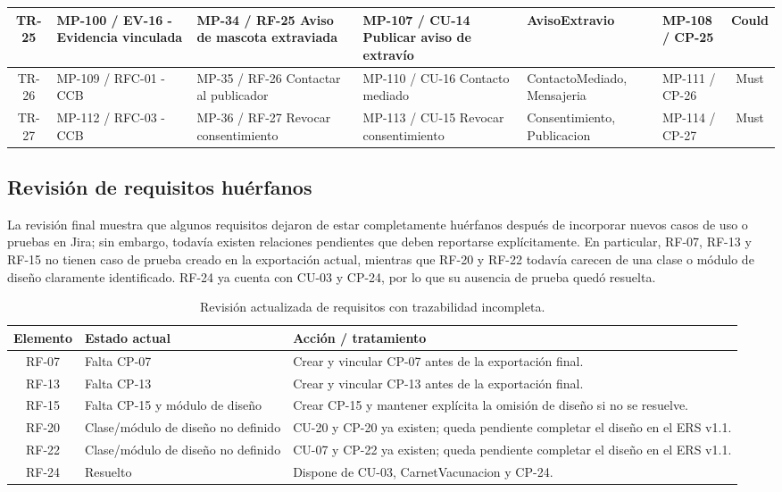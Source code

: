 \documentclass[journal,onecolumn]{IEEEtran}
\begin{document}
\begin{longtable}{|c|p{2.6cm}|p{2.9cm}|p{2.9cm}|p{2.6cm}|p{1.8cm}|c|}
		\hline
		TR-25 & MP-100 / EV-16 - Evidencia vinculada & MP-34 / RF-25 Aviso de mascota extraviada & MP-107 / CU-14 Publicar aviso de extravío & AvisoExtravio & MP-108 / CP-25 & Could \\
		\hline
		TR-26 & MP-109 / RFC-01 - CCB & MP-35 / RF-26 Contactar al publicador & MP-110 / CU-16 Contacto mediado & ContactoMediado, Mensajeria & MP-111 / CP-26 & Must \\
		\hline
		TR-27 & MP-112 / RFC-03 - CCB & MP-36 / RF-27 Revocar consentimiento & MP-113 / CU-15 Revocar consentimiento & Consentimiento, Publicacion & MP-114 / CP-27 & Must \\
		\hline
	\end{longtable}
	
	\subsection{Revisión de requisitos huérfanos}
	
	La revisión final muestra que algunos requisitos dejaron de estar completamente huérfanos después de incorporar nuevos casos de uso o pruebas en Jira; sin embargo, todavía existen relaciones pendientes que deben reportarse explícitamente. En particular, RF-07, RF-13 y RF-15 no tienen caso de prueba creado en la exportación actual, mientras que RF-20 y RF-22 todavía carecen de una clase o módulo de diseño claramente identificado. RF-24 ya cuenta con CU-03 y CP-24, por lo que su ausencia de prueba quedó resuelta.
	
	\begin{table}[h]
		\centering
		\small
		\begin{tabular}{|c|p{4.2cm}|p{6.5cm}|}
			\hline
			\textbf{Elemento} & \textbf{Estado actual} & \textbf{Acción / tratamiento} \\
			\hline
			RF-07 & Falta CP-07 & Crear y vincular CP-07 antes de la exportación final. \\
			\hline
			RF-13 & Falta CP-13 & Crear y vincular CP-13 antes de la exportación final. \\
			\hline
			RF-15 & Falta CP-15 y módulo de diseño & Crear CP-15 y mantener explícita la omisión de diseño si no se resuelve. \\
			\hline
			RF-20 & Clase/módulo de diseño no definido & CU-20 y CP-20 ya existen; queda pendiente completar el diseño en el ERS v1.1. \\
			\hline
			RF-22 & Clase/módulo de diseño no definido & CU-07 y CP-22 ya existen; queda pendiente completar el diseño en el ERS v1.1. \\
			\hline
			RF-24 & Resuelto & Dispone de CU-03, CarnetVacunacion y CP-24. \\
			\hline
		\end{tabular}
		\caption{Revisión actualizada de requisitos con trazabilidad incompleta.}
		\label{tab:huerfanos}
	\end{table}
	
\end{document}
